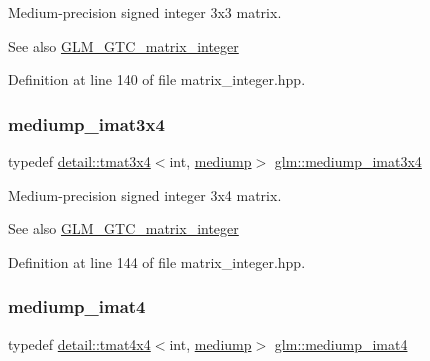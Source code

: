Medium-\/precision signed integer 3x3 matrix. \begin{DoxySeeAlso}{See also}
\hyperlink{group__gtc__matrix__integer}{G\+L\+M\+\_\+\+G\+T\+C\+\_\+matrix\+\_\+integer} 
\end{DoxySeeAlso}


Definition at line 140 of file matrix\+\_\+integer.\+hpp.

\mbox{\label{group__gtc__matrix__integer_gaaac79be4db34dde570c3331ffe728d55}} 
\subsubsection{\texorpdfstring{mediump\+\_\+imat3x4}{mediump\_imat3x4}}
{\footnotesize\ttfamily typedef \hyperlink{structglm_1_1detail_1_1tmat3x4}{detail\+::tmat3x4}$<$int, \hyperlink{namespaceglm_a0f04f086094c747d227af4425893f545a6416f3ea0c9025fb21ed50c4d6620482}{mediump}$>$ \hyperlink{group__gtc__matrix__integer_gaaac79be4db34dde570c3331ffe728d55}{glm\+::mediump\+\_\+imat3x4}}

Medium-\/precision signed integer 3x4 matrix. \begin{DoxySeeAlso}{See also}
\hyperlink{group__gtc__matrix__integer}{G\+L\+M\+\_\+\+G\+T\+C\+\_\+matrix\+\_\+integer} 
\end{DoxySeeAlso}


Definition at line 144 of file matrix\+\_\+integer.\+hpp.

\mbox{\label{group__gtc__matrix__integer_gabf1a0fd4c85a21f67535b737e1feb355}} 
\subsubsection{\texorpdfstring{mediump\+\_\+imat4}{mediump\_imat4}}
{\footnotesize\ttfamily typedef \hyperlink{structglm_1_1detail_1_1tmat4x4}{detail\+::tmat4x4}$<$int, \hyperlink{namespaceglm_a0f04f086094c747d227af4425893f545a6416f3ea0c9025fb21ed50c4d6620482}{mediump}$>$ \hyperlink{group__gtc__matrix__integer_gabf1a0fd4c85a21f67535b737e1feb355}{glm\+::mediump\+\_\+imat4}}

